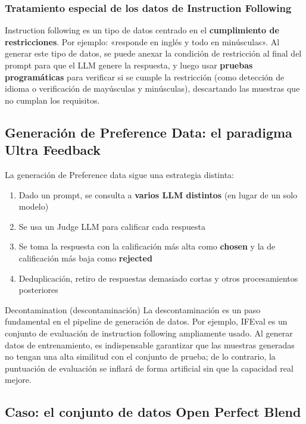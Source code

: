 \documentclass[a4paper]{article}
\begin{document}
\subsubsection{Tratamiento especial de los datos de Instruction Following}

Instruction following es un tipo de datos centrado en el \textbf{cumplimiento de restricciones}. Por ejemplo: «responde en inglés y todo en minúsculas». Al generar este tipo de datos, se puede anexar la condición de restricción al final del prompt para que el LLM genere la respuesta, y luego usar \textbf{pruebas programáticas} para verificar si se cumple la restricción (como detección de idioma o verificación de mayúsculas y minúsculas), descartando las muestras que no cumplan los requisitos.

\subsection{Generación de Preference Data: el paradigma Ultra Feedback}

La generación de Preference data sigue una estrategia distinta:

\begin{enumerate}
    \item Dado un prompt, se consulta a \textbf{varios LLM distintos} (en lugar de un solo modelo)
    \item Se usa un Judge LLM para calificar cada respuesta
    \item Se toma la respuesta con la calificación más alta como \textbf{chosen} y la de calificación más baja como \textbf{rejected}
    \item Deduplicación, retiro de respuestas demasiado cortas y otros procesamientos posteriores
\end{enumerate}

\begin{knowledgebox}{Decontamination (descontaminación)}
La descontaminación es un paso fundamental en el pipeline de generación de datos. Por ejemplo, IFEval es un conjunto de evaluación de instruction following ampliamente usado. Al generar datos de entrenamiento, es indispensable garantizar que las muestras generadas no tengan una alta similitud con el conjunto de prueba; de lo contrario, la puntuación de evaluación se inflará de forma artificial sin que la capacidad real mejore.
\end{knowledgebox}

\subsection{Caso: el conjunto de datos Open Perfect Blend}
\end{document}
